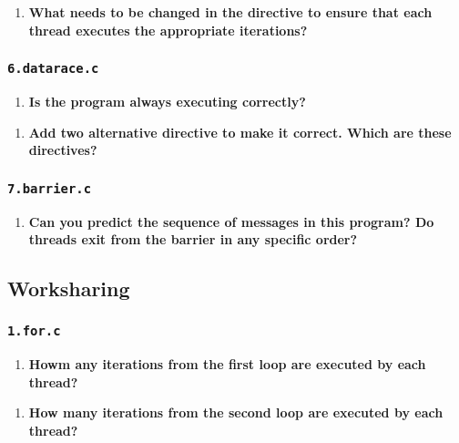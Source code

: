 \documentclass[a4paper]{article}
\begin{document}
\begin{enumerate}[resume]
	\item \textbf{What needs to be changed in the directive to ensure that each thread executes the appropriate iterations?}
\end{enumerate}

\subsubsection{\texttt{6.datarace.c}}

\begin{enumerate}
	\item \textbf{Is the program always executing correctly?}
\end{enumerate}

\begin{enumerate}[resume]
	\item \textbf{Add two alternative directive to make it correct. Which are these directives?}
\end{enumerate}

\subsubsection{\texttt{7.barrier.c}}

\begin{enumerate}
	\item \textbf{Can you predict the sequence of messages in this program? Do threads exit from the barrier in any specific order?}
\end{enumerate}


\subsection{Worksharing}
\subsubsection{\texttt{1.for.c}}

\begin{enumerate}
	\item \textbf{Howm any iterations from the first loop are executed by each thread?}
\end{enumerate}

\begin{enumerate}[resume]
	\item \textbf{How many iterations from the second loop are executed by each thread?}
\end{enumerate}
\end{document}
